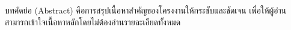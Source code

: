 \begin{abstractTH}
บทคัดย่อ (Abstract) คือการสรุปเนื้อหาสำคัญของโครงงานให้กระชับและชัดเจน เพื่อให้ผู้อ่านสามารถเข้าใจเนื้อหาหลักโดยไม่ต้องอ่านรายละเอียดทั้งหมด

\end{abstractTH}

